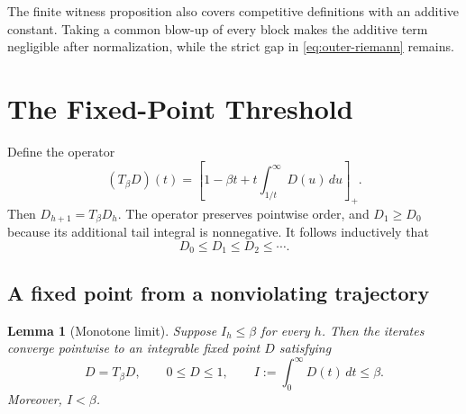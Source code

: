 \documentclass[11pt,letterpaper]{article}
\newcommand{\cref}[1]{\autoref{#1}}
\newtheorem{lemma}[theorem]{Lemma}
\theoremstyle{definition}
\theoremstyle{remark}
\newcommand{\pos}[1]{\left[#1\right]_{+}}
\begin{document}
The finite witness proposition also covers competitive definitions with an additive constant.
Taking a common blow-up of every block makes the additive term negligible after normalization, while the strict gap in \cref{eq:outer-riemann} remains.

\section{The Fixed-Point Threshold}\label{sec:fixed-point}

Define the operator
\begin{equation}\label{eq:operator} (T_{\beta}D)(t)=\pos{1-\beta t+t\int_{1/t}^{\infty}D(u)\,du}. \end{equation}
Then $D_{h+1}=T_{\beta}D_h$.
The operator preserves pointwise order, and $D_1\ge D_0$ because its additional tail integral is nonnegative.
It follows inductively that
\begin{equation}\label{eq:monotone-iterates} D_0\le D_1\le D_2\le\cdots. \end{equation}

\subsection{A fixed point from a nonviolating trajectory}

\begin{lemma}[Monotone limit]\label{lem:monotone-limit}
Suppose $I_h\le\beta$ for every $h$.
Then the iterates converge pointwise to an integrable fixed point $D$ satisfying
\begin{equation}\label{eq:fixed-point} D=T_{\beta}D,\qquad 0\le D\le1,\qquad I:=\int_0^{\infty}D(t)\,dt\le\beta. \end{equation}
Moreover, $I<\beta$.
\end{lemma}
\end{document}
